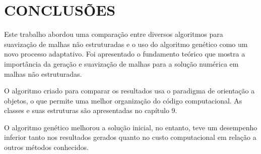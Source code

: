 \chapter[CONCLUSÕES]{CONCLUSÕES}

Este trabalho abordou uma comparação entre diversos algoritmos para suavização de malhas não estruturadas e o uso do algoritmo genético como um novo processo adaptativo. Foi apresentado o fundamento teórico que mostra a importância da geração e suavização de malhas para a solução numérica em malhas não estruturadas.

O algoritmo criado para comparar os resultados usa o paradigma de orientação a objetos, o que permite uma melhor organização do código computacional. As classes e suas estruturas são apresentadas no capítulo 9.

O algoritmo genético melhorou a solução inicial, no entanto, teve um desempenho inferior tanto nos resultados gerados quanto no custo computacional em relação a outros métodos conhecidos.